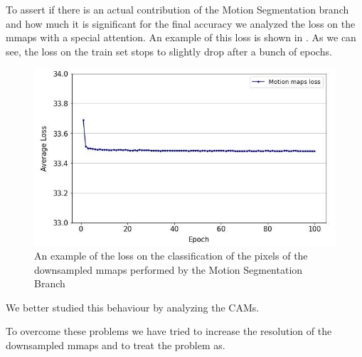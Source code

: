 \documentclass[10pt,twocolumn,hidelinks,letterpaper]{article}
\begin{document}
To assert if there is an actual contribution of the Motion Segmentation branch and how much it is significant for the final accuracy we analyzed the loss on the mmaps with a special attention. An example of this loss is shown in . As we can see, the loss on the train set stops to slightly drop after a bunch of epochs.

\begin{figure}[t]
  \centering
  \includegraphics[width=\linewidth]{images/mmaps_loss.jpg}
  \caption{An example of the loss on the classification of the pixels of the downsampled mmaps performed by the Motion Segmentation Branch}
  \label{loss_mmaps}
\end{figure}

We better studied this behaviour by analyzing the CAMs.

To overcome these problems we have tried to increase the resolution of the downsampled mmaps and to treat the problem as.
\end{document}
